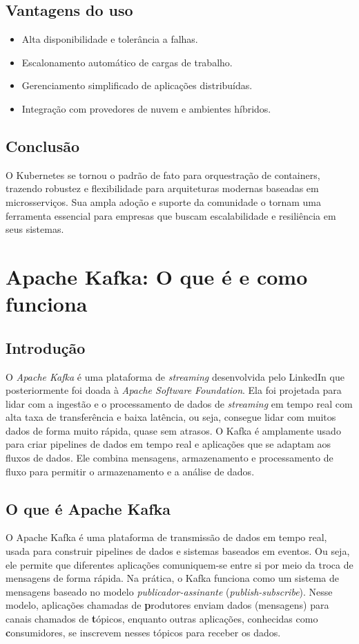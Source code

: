 \documentclass{abntex2}
\begin{document}
\section{Vantagens do uso}
\begin{itemize}
    \item Alta disponibilidade e tolerância a falhas.
    \item Escalonamento automático de cargas de trabalho.
    \item Gerenciamento simplificado de aplicações distribuídas.
    \item Integração com provedores de nuvem e ambientes híbridos.
\end{itemize}

\section{Conclusão}
O Kubernetes se tornou o padrão de fato para orquestração de containers, trazendo robustez e flexibilidade para arquiteturas modernas baseadas em microsserviços. 
Sua ampla adoção e suporte da comunidade o tornam uma ferramenta essencial para empresas que buscam escalabilidade e resiliência em seus sistemas.

\chapter{Apache Kafka: O que é e como funciona}

\section{Introdução}
O \textit{Apache Kafka} é uma plataforma de \textit{streaming} desenvolvida pelo LinkedIn que posteriormente foi doada à \textit{Apache Software Foundation}. 
Ela foi projetada para lidar com a ingestão e o processamento de dados de \textit{streaming} em tempo real com alta taxa de transferência e baixa latência, ou seja, consegue lidar com muitos dados de forma muito rápida, quase sem atrasos. O Kafka é amplamente usado para criar pipelines de dados em tempo real e aplicações que se adaptam aos fluxos de dados. 
Ele combina mensagens, armazenamento e processamento de fluxo para permitir o armazenamento e a análise de dados.

\section{O que é Apache Kafka}
O Apache Kafka é uma plataforma de transmissão de dados em tempo real, usada para construir pipelines de dados e sistemas baseados em eventos. Ou seja, ele permite que diferentes aplicações comuniquem-se entre si por meio da troca de mensagens de forma rápida. Na prática, o Kafka funciona como um sistema de mensagens baseado no modelo \textit{publicador-assinante} (\textit{publish-subscribe}). Nesse modelo, aplicações chamadas de \textbf produtores enviam dados (mensagens) para canais chamados de \textbf tópicos, enquanto outras aplicações, conhecidas como \textbf consumidores, se inscrevem nesses tópicos para receber os dados.
\end{document}
